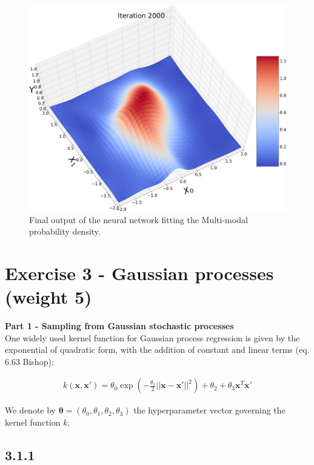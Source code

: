 \documentclass[a4paper]{article}
\begin{document}
\begin{figure}[H]
\includegraphics[width=\textwidth]{Images/2Final/2000.png}
\caption{Final output of the neural network fitting the Multi-modal probability density.}
\label{Final2}
\end{figure}



\section*{Exercise 3 - Gaussian processes (weight 5)}


\textbf{Part 1 - Sampling from Gaussian stochastic processes}\\

One widely used kernel function for Gaussian process regression is given by the exponential of quadratic form, with the addition of constant and linear terms (eq. 6.63 Bishop):

\begin{eqnarray} \label{eq:5}
k(\textbf{x}, \textbf{x}') = \theta_0 \exp(- \frac{\theta_1}{2} || \textbf{x} - \textbf{x}' ||^2) + \theta_2 + \theta_3 \textbf{x}^T \textbf{x}'
\end{eqnarray}

We denote by $\boldsymbol{\theta}  = (\theta_0, \theta_1, \theta_2, \theta_3)$ the hyperparameter vector governing the kernel function $k$.

\subsection*{3.1.1}
\end{document}
